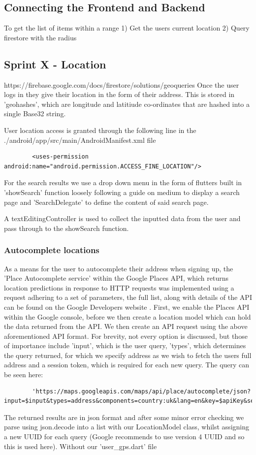 \documentclass[12pt]{article}
\begin{document}
	\subsection{Connecting the Frontend and Backend}
	To get the list of items within a range
	1) Get the users current location
	2) Query firestore with the radius
	
	\subsection{Sprint X - Location}
	https://firebase.google.com/docs/firestore/solutions/geoqueries
	Once the user logs in they give their location in the form of their address. This is stored in 'geohashes', which are longitude and latitiude co-ordinates that are hashed into a single Base32 string.
	
	User location access is granted through the following line in the ./android/app/src/main/AndroidManifest.xml file
	\begin{lstlisting}
		<uses-permission android:name="android.permission.ACCESS_FINE_LOCATION"/>
	\end{lstlisting}
	For the search results we use a drop down menu in the form of flutters built in 'showSearch' function loosely following a guide on medium \cite{medium-comerge} to display a search page and 'SearchDelegate' to define the content of said search page.
	
	A textEditingController is used to collect the inputted data from the user and pass through to the showSearch function.
	
	\subsubsection{Autocomplete locations}
	As a means for the user to autocomplete their address when signing up, the 'Place Autocomplete service' within the Google Places API, which returns location predictions in response to HTTP requests was implemented using a request adhering to a set of parameters, the full list, along with details of the API can be found on the Google Developers website \cite{requests}.
	First, we enable the Places API within the Google console, before we then create a location model which can hold the data returned from the API. We then create an API request using the above aforementioned API format. For brevity, not every option is discussed, but those of importance include 'input', which is the user query, 'types', which determines the query returned, for which we specify address as we wish to fetch the users full address and a session token, which is required for each new query. The query can be seen here:
	\begin{lstlisting}
		'https://maps.googleapis.com/maps/api/place/autocomplete/json?input=$input&types=address&components=country:uk&lang=en&key=$apiKey&sessiontoken=$sessionToken'
	\end{lstlisting}
	The returned results are in json format and after some minor error checking we parse using json.decode into a list with our LocationModel class, whilst assigning a new UUID for each query (Google recommends to use version 4 UUID and so this is used here). Without our 'user\_gps.dart' file
	
\end{document}
